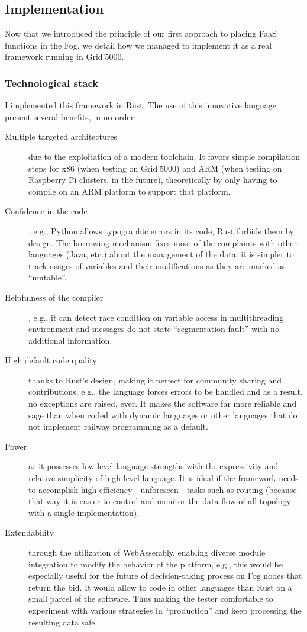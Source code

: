 \subsection{Implementation}

Now that we introduced the principle of our first approach to placing \gls{FaaS} functions in the Fog, we detail how we managed to implement it as a real framework running in Grid'5000.

\subsubsection{Technological stack}

I implemented this framework in Rust. The use of this innovative language present several benefits, in no order:
\begin{description}
	\item[Multiple targeted architectures]due to the exploitation of a modern toolchain. It favors simple compilation steps for x86 (when testing on Grid’5000) and ARM (when testing on Raspberry Pi clusters, in the future), theoretically by only having to compile on an ARM platform to support that platform.
	\item[Confidence in the code], e.g., Python allows typographic errors in its code, Rust forbids them by design. The borrowing mechanism fixes most of the complaints with other languages (Java, etc.) about the management of the data: it is simpler to track usages of variables and their modifications as they are marked as “mutable”.
	\item[Helpfulness of the compiler], e.g., it can detect race condition on variable access in multithreading environment and messages do not state “segmentation fault” with no additional information.
	\item[High default code quality]thanks to Rust's design, making it perfect for community sharing and contributions. e.g., the language forces errors to be handled and as a result, no exceptions are raised, ever. It makes the software far more reliable and sage than when coded with dynamic languages or other languages that do not implement railway programming as a default.
	\item[Power]as it possesses low-level language strengths with the expressivity and relative simplicity of high-level language. It is ideal if the framework needs to accomplish high efficiency—unforeseen—tasks such as routing (because that way it is easier to control and monitor the data flow of all topology with a single implementation).
	\item[Extendability]through the utilization of WebAssembly, enabling diverse module integration to modify the behavior of the platform, e.g., this would be especially useful for the future of decision-taking process on Fog nodes that return the bid. It would allow to code in other languages than Rust on a small parcel of the software. Thus making the tester comfortable to experiment with various strategies in “production” and keep  processing the resulting data safe.
\end{description}

